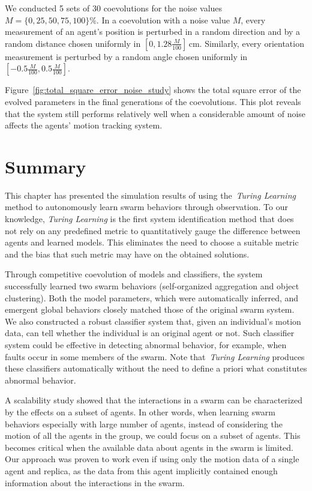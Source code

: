 We conducted 5 sets of 30 coevolutions for the noise values $M=\{0, 25, 50, 75, 100\}\%$. In a coevolution with a noise value $M$, every measurement of an agent's position is perturbed in a random direction and by a random distance chosen uniformly in $\left[0, 1.28\frac{M}{100}\right] \,\textrm{cm}$. Similarly, every orientation measurement is perturbed by a random angle chosen uniformly in $\left[-0.5\frac{M}{100}, 0.5\frac{M}{100}\right]$.

Figure~\ref{fig:total_square_error_noise_study} shows the total square error of the evolved parameters in the final generations of the coevolutions. This plot reveals that the system still performs relatively well when a considerable amount of noise affects the agents' motion tracking system.

\section{Summary}\label{sec:summary_simulation_swarm}

This chapter has presented the simulation results of using the~\textit{Turing Learning} method to autonomously learn swarm behaviors through observation. To our knowledge, \textit{Turing Learning} is the first system identification method that does not rely on any predefined metric to quantitatively gauge the difference between agents and learned models. This eliminates the need to choose a suitable metric and the bias that such metric may have on the obtained solutions. 

Through competitive coevolution of models and classifiers, the system successfully learned two swarm behaviors (self-organized aggregation and object clustering). Both the model parameters, which were automatically inferred, and emergent global behaviors closely matched those of the original swarm system. We also constructed a robust classifier system that, given an individual's motion data, can tell whether the individual is an original agent or not. Such classifier system could be effective in detecting abnormal behavior, for example, when faults occur in some members of the swarm. Note that~\textit{Turing Learning} produces these classifiers automatically without the need to define a priori what constitutes abnormal behavior. 

A scalability study showed that the interactions in a swarm can be characterized by the effects on a subset of agents. In other words, when learning swarm behaviors especially with large number of agents, instead of considering the motion of all the agents in the group, we could focus on a subset of agents. This becomes critical when the available data about agents in the swarm is limited. Our approach was proven to work even if using only the motion data of a single agent and replica, as the data from this agent implicitly contained enough information about the interactions in the swarm.   

